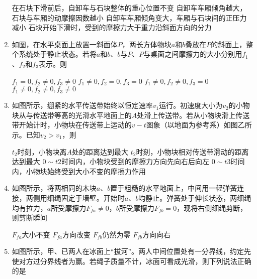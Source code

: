 \begin{enumerate}[leftmargin=0em]
\fourchoices
{在石块下滑前后，自卸车与石块整体的重心位置不变}
{自卸车车厢倾角越大，石块与车厢的动摩擦因数越小}
{自卸车车厢倾角变大，车厢与石块间的正压力减小}
{石块开始下滑时，受到的摩擦力大于重力沿斜面方向的分力}


\item 
{}
如图，在水平桌面上放置一斜面体$ P $，两长方体物块$ a $和$ b $叠放在$ P $的斜面上，整个系统处于静止状态。若将$ a $和$ b $、$ b $与$ P $、$ P $与桌面之间摩擦力的大小分别用$ f_{1} $、$ f_{2} $和$ f_{3} $表示。则  
\begin{figure}[h!]
\centering

\end{figure}


\fourchoices
{$f _ { 1 } = 0 , f _ { 2 } \neq 0 , f _ { 3 } \neq 0$}
{$f _ { 1 } \neq 0 , f _ { 2 } = 0 , f _ { 3 } = 0$}
{$f _ { 1 } \neq 0 , f _ { 2 } \neq 0 , f _ { 3 } = 0$}
{$f _ { 1 } \neq 0 , f _ { 2 } \neq 0 , f _ { 3 } \neq 0$}


\item 
{}
如图所示，绷紧的水平传送带始终以恒定速率$ v_{1} $运行。初速度大小为$ v_{2} $的小物块从与传送带等高的光滑水平地面上的$ A $处滑上传送带。若从小物块滑上传送带开始计时，小物块在传送带上运动的$ v-t $图象（以地面为参考系）如图乙所示。已知$ v_2>v_1 $，则  
\begin{figure}[h!]
\centering

\end{figure}


\fourchoices
{$ t_{2} $时刻，小物块离$ A $处的距离达到最大}
{$ t_{2} $时刻，小物块相对传送带滑动的距离达到最大}
{$ 0 \sim t2 $时间内，小物块受到的摩擦力方向先向右后向左}
{$ 0 \sim t3 $时间内，小物块始终受到大小不变的摩擦力作用}


\item 
{}
如图所示，将两相同的木块$ a $、$ b $置于粗糙的水平地面上，中间用一轻弹簧连接，两侧用细绳固定于墙壁。开始时$ a $、$ b $均静止。弹簧处于伸长状态，两细绳均有拉力，$ a $所受摩擦力$ F_{fa} \neq 0 $，$ b $所受摩擦力$ F_{fb}=0 $，现将右侧细绳剪断，则剪断瞬间  
\begin{figure}[h!]
\centering

\end{figure}


\fourchoices
{$ F_{fa} $大小不变 }
{$ F_{fa} $方向改变}
{$ F_{fb} $仍然为零 }
{$ F_{fb} $方向向右}

\item 
{}
如图所示，甲、已两人在冰面上“拔河”。两人中间位置处有一分界线，约定先使对方过分界线者为赢。若绳子质量不计，冰面可看成光滑，则下列说法正确的是  
\begin{figure}[h!]
\centering

\end{figure}



\end{enumerate}
